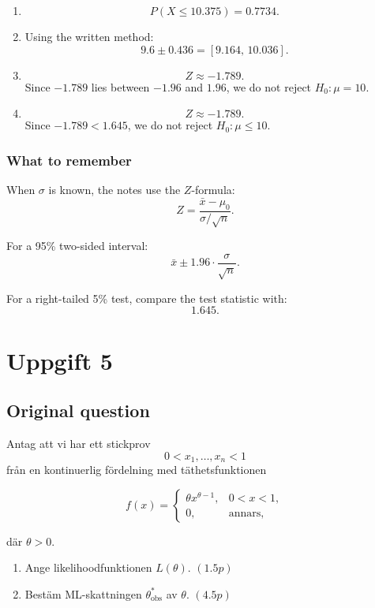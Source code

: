 \documentclass[10pt]{article}
\begin{document}
\begin{enumerate}[label=\alph*)]
\item
\[
P(X\le 10.375)=0.7734.
\]

\item
Using the written method:
\[
9.6\pm 0.436
= [9.164,\,10.036].
\]

\item
\[
Z\approx -1.789.
\]
Since \(-1.789\) lies between \(-1.96\) and \(1.96\),
we do not reject \(H_0:\mu=10\).

\item
\[
Z\approx -1.789.
\]
Since \(-1.789<1.645\), we do not reject
\(H_0:\mu\le 10\).
\end{enumerate}

\subsubsection*{What to remember}

When \(\sigma\) is known, the notes use the
\(Z\)-formula:
\[
Z=
\frac{\bar{x}-\mu_0}{\sigma/\sqrt{n}}.
\]

For a 95\% two-sided interval:
\[
\bar{x}
\pm
1.96\cdot
\frac{\sigma}{\sqrt{n}}.
\]

For a right-tailed 5\% test, compare the test
statistic with:
\[
1.645.
\]

\section*{Uppgift 5}

\subsection*{Original question}

Antag att vi har ett stickprov
\[
0<x_1,\ldots,x_n<1
\]
från en kontinuerlig fördelning med täthetsfunktionen

\[
f(x)=
\begin{cases}
\theta x^{\theta-1},
& 0<x<1,\\
0,
& \text{annars},
\end{cases}
\]

där \(\theta>0\).

\begin{enumerate}[label=\alph*)]
\item Ange likelihoodfunktionen \(L(\theta)\).
\hfill \((1.5p)\)

\item Bestäm ML-skattningen
\(\theta^*_{\text{obs}}\) av \(\theta\).
\hfill \((4.5p)\)
\end{enumerate}
\end{document}
